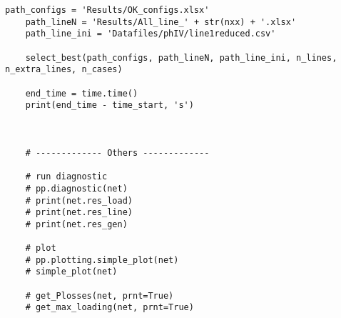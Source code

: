 \begin{lstlisting}[caption={Main code in Python with the Pandapower library}]
    path_configs = 'Results/OK_configs.xlsx'
    path_lineN = 'Results/All_line_' + str(nxx) + '.xlsx'
    path_line_ini = 'Datafiles/phIV/line1reduced.csv'

    select_best(path_configs, path_lineN, path_line_ini, n_lines, n_extra_lines, n_cases)

    end_time = time.time()
    print(end_time - time_start, 's')



    # ------------- Others -------------

    # run diagnostic
    # pp.diagnostic(net)
    # print(net.res_load)
    # print(net.res_line)
    # print(net.res_gen)

    # plot
    # pp.plotting.simple_plot(net)
    # simple_plot(net)

    # get_Plosses(net, prnt=True)
    # get_max_loading(net, prnt=True)



\end{lstlisting}


